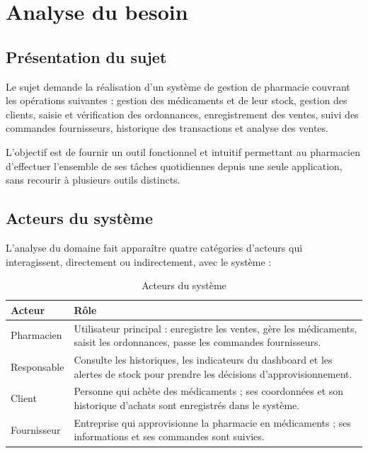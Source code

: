 \documentclass[12pt,a4paper]{report}
\begin{document}
\chapter{Analyse du besoin}

\section{Présentation du sujet}

Le sujet demande la réalisation d'un système de gestion de pharmacie couvrant les opérations suivantes : gestion des médicaments et de leur stock, gestion des clients, saisie et vérification des ordonnances, enregistrement des ventes, suivi des commandes fournisseurs, historique des transactions et analyse des ventes.

L'objectif est de fournir un outil fonctionnel et intuitif permettant au pharmacien d'effectuer l'ensemble de ses tâches quotidiennes depuis une seule application, sans recourir à plusieurs outils distincts.

\section{Acteurs du système}

L'analyse du domaine fait apparaître quatre catégories d'acteurs qui interagissent, directement ou indirectement, avec le système :

\begin{table}[H]
\centering
\begin{tabularx}{\textwidth}{lX}
\toprule
\textbf{Acteur} & \textbf{Rôle} \\
\midrule
Pharmacien     & Utilisateur principal : enregistre les ventes, gère les médicaments, saisit les ordonnances, passe les commandes fournisseurs. \\
Responsable    & Consulte les historiques, les indicateurs du dashboard et les alertes de stock pour prendre les décisions d'approvisionnement. \\
Client         & Personne qui achète des médicaments ; ses coordonnées et son historique d'achats sont enregistrés dans le système. \\
Fournisseur    & Entreprise qui approvisionne la pharmacie en médicaments ; ses informations et ses commandes sont suivies. \\
\bottomrule
\end{tabularx}
\caption{Acteurs du système}
\end{table}
\end{document}
